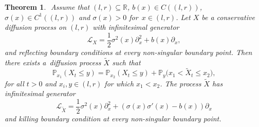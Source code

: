 \documentclass[10pt,a4paper]{amsart}
\numberwithin{equation}{section}
\newtheorem{Theorem}{Theorem}[section]
\theoremstyle{definition}
\def\L{{\mathcal L}}
\def\p{{\mathbb P}}
\def\r{{\mathbb R}}
\begin{document}
\begin{Theorem}\label{thm:main}${}$
Assume that $(l,r) \subseteq \r$, $b(x) \in C((l,r))$, $\sigma(x)\in C^1((l,r))$ and $\sigma(x)>0$ for~${x \in (l,r)}$. Let $X$ be a conservative diffusion process on $(l,r)$ with infinitesimal generator
 \[
 \L_X=\frac{1}{2} \sigma^2(x) \partial_x^2+b(x) \partial_x,
 \]
 and reflecting boundary conditions at every non-singular boundary point. Then there exists a~diffusion process $\widetilde X$ such that
\begin{equation}\label{eqn:main}
\p_{x_1}(X_t\le y)=\p_{x_2}(X_t\le y)+\p_y\bigl(x_1<\widetilde X_t \le x_2\bigr),
\end{equation}
for all $t>0$ and $x_i,y \in (l,r)$ for which $x_1<x_2$. The process $\widetilde X$ has infinitesimal generator
\begin{equation}\label{def_tilde_L2}
\L_{\widetilde X}=\frac{1}{2} \sigma^2(x) \partial_x^2+(\sigma(x)\sigma'(x) - b(x) )\partial_x
\end{equation}
and killing boundary condition at every non-singular boundary point.
\end{Theorem}
\end{document}
